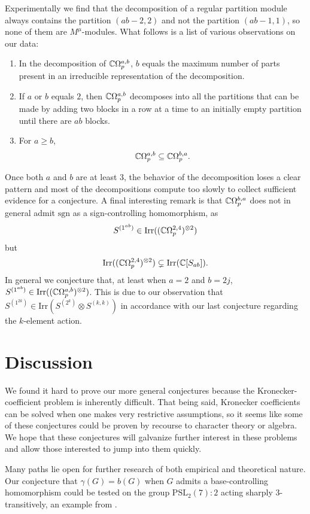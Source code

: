 \documentclass[12pt,twoside]{reedthesis}
\theoremstyle{plain}   %
\theoremstyle{definition}
\theoremstyle{remark}
\numberwithin{equation}{section}
\def\irr{\mathrm{Irr}}
\begin{document}
Experimentally we find that the decomposition of a regular partition module always contains the partition $(ab-2,2)$ and not the partition $(ab-1,1)$, so none of them are $M^\mu$-modules.
What follows is a list of various observations on our data:
\begin{enumerate}

\item In the decomposition of $\mathbb{C} \Omega_p^{a,b}$, $b$ equals the maximum number of parts present in an irreducible representation of the decomposition.
\item If $a$ or $b$ equals $2$, then $\mathbb{C} \Omega_p^{a,b}$ decomposes into all the partitions that can be made by adding two blocks in a row at a time to an initially empty partition until there are $ab$ blocks.
\item For $a \geq b$,
  \[ \mathbb{C} \Omega_p^{a,b} \subseteq \mathbb{C} \Omega_p^{b,a}.\]
\end{enumerate}
Once both $a$ and $b$ are at least $3$, the behavior of the decomposition loses a clear pattern and most of the decompositions compute too slowly to collect sufficient evidence for a conjecture.
A final interesting remark is that $\mathbb{C} \Omega_p^{b,a}$ does not in general admit $\mathrm{sgn}$ as a sign-controlling homomorphism, as
\[S^{(1^{ab})} \in \irr((\CC \Omega_p^{2,4})^{\otimes 2})\] but \[ \irr((\CC \Omega_p^{2,4})^{\otimes 2}) \subsetneq \irr(\CC [S_{ab}]).\]
In general we conjecture that, at least when $a=2$ and $b= 2j$, $S^{(1^{ab})} \in \irr((\CC \Omega_p^{a,b})^{\otimes 2})$. This is due to our observation that $S^{(1^{2k})} \in \irr(S^{(2^k)} \otimes S^{(k,k)})$ in accordance with
our last conjecture regarding the $k$-element action.

\chapter{Discussion}
We found it hard to prove our more general conjectures because the Kronecker-coefficient problem is inherently difficult.
That being said, Kronecker coefficients can be solved when one makes very restrictive assumptions, so it seems like some of these conjectures could be proven by recourse to character theory
or algebra.
We hope that these conjectures will galvanize further interest in these problems and allow those interested to jump into them quickly. \par
Many paths lie open for further research of both empirical and theoretical nature.
Our conjecture that $\gamma(G) = b(G)$ when $G$ admits a base-controlling homomorphism could be tested on the group $\mathrm{PSL}_2(7) : 2$ acting sharply $3$-transitively, an example from \cite{valle24}.
\end{document}
